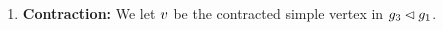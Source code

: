 \begin{enumerate}
\begin{enumerate}
\end{enumerate}
\item {\bf Contraction:}
  We let $v$ be the contracted simple vertex in $g_3\lhd g_1$.


\end{enumerate}
